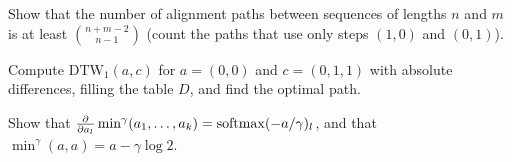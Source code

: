 \begin{notechapter}
\begin{exercise}\label{dtw:exr:1}
Show that the number of alignment paths between sequences of lengths $n$ and $m$ is at least
$\binom{n + m - 2}{n - 1}$ (count the paths that use only steps $(1, 0)$ and $(0, 1)$).
\end{exercise}

\begin{exercise}\label{dtw:exr:2}
Compute $\mathrm{DTW}_1(a, c)$ for $a = (0, 0)$ and $c = (0, 1, 1)$ with absolute differences, filling the table
$D$, and find the optimal path.
\end{exercise}

\begin{exercise}\label{dtw:exr:3}
Show that $\frac{\partial}{\partial a_l}\operatorname{min}^\gamma(a_1,\dots,a_k) = \operatorname{softmax}(-a/\gamma)_l$, and that $\operatorname{min}^\gamma(a, a) = a - \gamma\log2$.
\end{exercise}
\end{notechapter}

